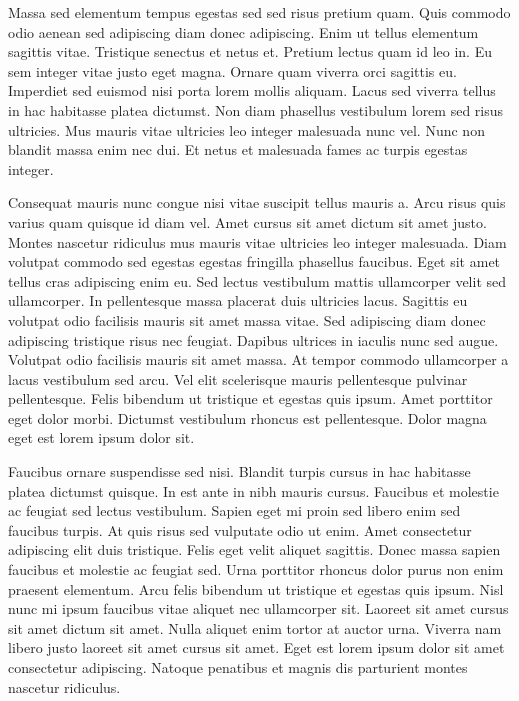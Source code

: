 \documentclass[11pt,a4paper]{article}
\begin{document}
Massa sed elementum tempus egestas sed sed risus pretium quam. Quis commodo odio aenean sed adipiscing diam donec adipiscing. Enim ut tellus elementum sagittis vitae. Tristique senectus et netus et. Pretium lectus quam id leo in. Eu sem integer vitae justo eget magna. Ornare quam viverra orci sagittis eu. Imperdiet sed euismod nisi porta lorem mollis aliquam. Lacus sed viverra tellus in hac habitasse platea dictumst. Non diam phasellus vestibulum lorem sed risus ultricies. Mus mauris vitae ultricies leo integer malesuada nunc vel. Nunc non blandit massa enim nec dui. Et netus et malesuada fames ac turpis egestas integer.

Consequat mauris nunc congue nisi vitae suscipit tellus mauris a. Arcu risus quis varius quam quisque id diam vel. Amet cursus sit amet dictum sit amet justo. Montes nascetur ridiculus mus mauris vitae ultricies leo integer malesuada. Diam volutpat commodo sed egestas egestas fringilla phasellus faucibus. Eget sit amet tellus cras adipiscing enim eu. Sed lectus vestibulum mattis ullamcorper velit sed ullamcorper. In pellentesque massa placerat duis ultricies lacus. Sagittis eu volutpat odio facilisis mauris sit amet massa vitae. Sed adipiscing diam donec adipiscing tristique risus nec feugiat. Dapibus ultrices in iaculis nunc sed augue. Volutpat odio facilisis mauris sit amet massa. At tempor commodo ullamcorper a lacus vestibulum sed arcu. Vel elit scelerisque mauris pellentesque pulvinar pellentesque. Felis bibendum ut tristique et egestas quis ipsum. Amet porttitor eget dolor morbi. Dictumst vestibulum rhoncus est pellentesque. Dolor magna eget est lorem ipsum dolor sit.

Faucibus ornare suspendisse sed nisi. Blandit turpis cursus in hac habitasse platea dictumst quisque. In est ante in nibh mauris cursus. Faucibus et molestie ac feugiat sed lectus vestibulum. Sapien eget mi proin sed libero enim sed faucibus turpis. At quis risus sed vulputate odio ut enim. Amet consectetur adipiscing elit duis tristique. Felis eget velit aliquet sagittis. Donec massa sapien faucibus et molestie ac feugiat sed. Urna porttitor rhoncus dolor purus non enim praesent elementum. Arcu felis bibendum ut tristique et egestas quis ipsum. Nisl nunc mi ipsum faucibus vitae aliquet nec ullamcorper sit. Laoreet sit amet cursus sit amet dictum sit amet. Nulla aliquet enim tortor at auctor urna. Viverra nam libero justo laoreet sit amet cursus sit amet. Eget est lorem ipsum dolor sit amet consectetur adipiscing. Natoque penatibus et magnis dis parturient montes nascetur ridiculus.
\end{document}
